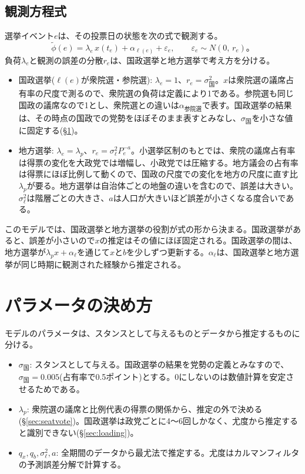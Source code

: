 \documentclass[a4paper,11pt]{ltjsarticle}
\begin{document}
\subsection{観測方程式}

選挙イベント$e$は、その投票日の状態を次の式で観測する。
\begin{equation}
  \tilde\phi(e) = \lambda_e\, x(t_e) + \alpha_{\ell(e)} + \varepsilon_e,
  \qquad
  \varepsilon_e \sim N\!\left(0,\, r_e\right)。
  \label{eq:obs}
\end{equation}
負荷$\lambda_e$と観測の誤差の分散$r_e$は、国政選挙と地方選挙で考え方を分ける。

\begin{itemize}
  \item 国政選挙($\ell(e)$が衆院選・参院選): $\lambda_e=1$、$r_e=\sigma_{\text{国}}^2$。$x$は衆院選の議席占有率の尺度で測るので、衆院選の負荷は定義により1である。参院選も同じ国政の議席なので1とし、衆院選との違いは$\alpha_{\text{参院選}}$で表す。国政選挙の結果は、その時点の国政での党勢をほぼそのまま表すとみなし、$\sigma_{\text{国}}$を小さな値に固定する(\S\ref{sec:params})。
  \item 地方選挙: $\lambda_e=\lambda_p$、$r_e=\sigma_\ell^2P_e^{-a}$。小選挙区制のもとでは、衆院の議席占有率は得票の変化を大政党では増幅し、小政党では圧縮する。地方議会の占有率は得票にほぼ比例して動くので、国政の尺度での変化を地方の尺度に直す比$\lambda_p$が要る。地方選挙は自治体ごとの地盤の違いを含むので、誤差は大きい。$\sigma_\ell^2$は階層ごとの大きさ、$a$は人口が大きいほど誤差が小さくなる度合いである。
\end{itemize}

このモデルでは、国政選挙と地方選挙の役割が式の形から決まる。国政選挙があると、誤差が小さいので$x$の推定はその値にほぼ固定される。国政選挙の間は、地方選挙が$\lambda_px+\alpha_\ell$を通じて$x$と$b$を少しずつ更新する。$\alpha_\ell$は、国政選挙と地方選挙が同じ時期に観測された経験から推定される。

\section{パラメータの決め方}
\label{sec:params}

モデルのパラメータは、スタンスとして与えるものとデータから推定するものに分ける。

\begin{itemize}
  \item $\sigma_{\text{国}}$: スタンスとして与える。国政選挙の結果を党勢の定義とみなすので、$\sigma_{\text{国}}=0.005$(占有率で0.5ポイント)とする。0にしないのは数値計算を安定させるためである。
  \item $\lambda_p$: 衆院選の議席と比例代表の得票の関係から、推定の外で決める(\S\ref{sec:seatvote})。国政選挙は政党ごとに4〜6回しかなく、尤度から推定すると識別できない(\S\ref{sec:loading})。
  \item $q_x, q_b, \sigma_\ell^2, a$: 全期間のデータから最尤法で推定する。尤度はカルマンフィルタの予測誤差分解で計算する。
\end{itemize}
\end{document}
